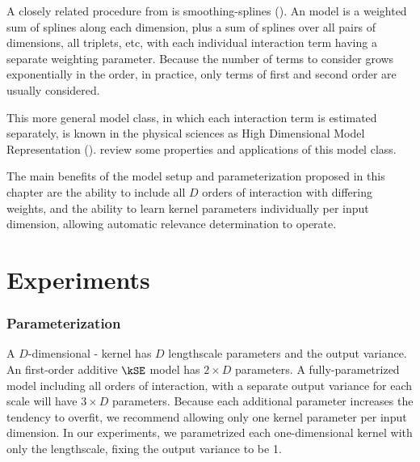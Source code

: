 A closely related procedure from \citet{wahba1990spline} is smoothing-splines \ANOVA{} (\SSANOVA{}).
An \SSANOVA{} model is a weighted sum of splines along each dimension, plus a sum of splines over all pairs of dimensions, all triplets, etc, with each individual interaction term having a separate weighting parameter.
Because the number of terms to consider grows exponentially in the order, in practice, only terms of first and second order are usually considered.


This more general model class, in which each interaction term is estimated separately, is known in the physical sciences as High Dimensional Model Representation (\HDMR{}).
\citet{rabitz1999general} review some properties and applications of this model class.

The main benefits of the model setup and parameterization proposed in this chapter are the ability to include all $D$ orders of interaction with differing weights, and the ability to learn kernel parameters individually per input dimension, allowing automatic relevance determination to operate.



\section{Experiments}
\label{sec:additive-experiments}

\subsubsection{Parameterization}
A $D$-dimensional \kSE-\ARD{} kernel has $D$ lengthscale parameters and the output variance.
An first-order additive $\kSE$ model has $2 \times D$ parameters.
A fully-parametrized model including all orders of interaction, with a separate output variance for each scale will have $3 \times D$ parameters.
Because each additional parameter increases the tendency to overfit, we recommend allowing only one kernel parameter per input dimension. 
%
%
In our experiments, we parametrized each one-dimensional kernel with only the lengthscale, fixing the output variance to be 1.


